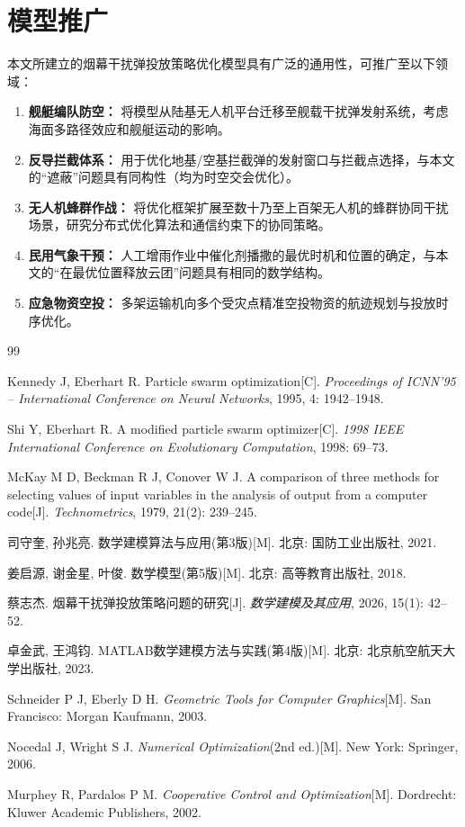 \documentclass[12pt,a4paper]{ctexart}
\begin{document}
\section{模型推广}

本文所建立的烟幕干扰弹投放策略优化模型具有广泛的通用性，可推广至以下领域：

\begin{enumerate}
    \item \textbf{舰艇编队防空：} 将模型从陆基无人机平台迁移至舰载干扰弹发射系统，考虑海面多路径效应和舰艇运动的影响。
    \item \textbf{反导拦截体系：} 用于优化地基/空基拦截弹的发射窗口与拦截点选择，与本文的“遮蔽”问题具有同构性（均为时空交会优化）。
    \item \textbf{无人机蜂群作战：} 将优化框架扩展至数十乃至上百架无人机的蜂群协同干扰场景，研究分布式优化算法和通信约束下的协同策略。
    \item \textbf{民用气象干预：} 人工增雨作业中催化剂播撒的最优时机和位置的确定，与本文的“在最优位置释放云团”问题具有相同的数学结构。
    \item \textbf{应急物资空投：} 多架运输机向多个受灾点精准空投物资的航迹规划与投放时序优化。
\end{enumerate}

\begin{thebibliography}{99}

Kennedy J, Eberhart R. Particle swarm optimization[C]. \textit{Proceedings of ICNN'95 -- International Conference on Neural Networks}, 1995, 4: 1942--1948.

Shi Y, Eberhart R. A modified particle swarm optimizer[C]. \textit{1998 IEEE International Conference on Evolutionary Computation}, 1998: 69--73.

McKay M D, Beckman R J, Conover W J. A comparison of three methods for selecting values of input variables in the analysis of output from a computer code[J]. \textit{Technometrics}, 1979, 21(2): 239--245.

司守奎, 孙兆亮. 数学建模算法与应用(第3版)[M]. 北京: 国防工业出版社, 2021.

姜启源, 谢金星, 叶俊. 数学模型(第5版)[M]. 北京: 高等教育出版社, 2018.

蔡志杰. 烟幕干扰弹投放策略问题的研究[J]. \textit{数学建模及其应用}, 2026, 15(1): 42--52.

卓金武, 王鸿钧. MATLAB数学建模方法与实践(第4版)[M]. 北京: 北京航空航天大学出版社, 2023.

Schneider P J, Eberly D H. \textit{Geometric Tools for Computer Graphics}[M]. San Francisco: Morgan Kaufmann, 2003.

Nocedal J, Wright S J. \textit{Numerical Optimization}(2nd ed.)[M]. New York: Springer, 2006.

Murphey R, Pardalos P M. \textit{Cooperative Control and Optimization}[M]. Dordrecht: Kluwer Academic Publishers, 2002.

\end{thebibliography}
\end{document}
